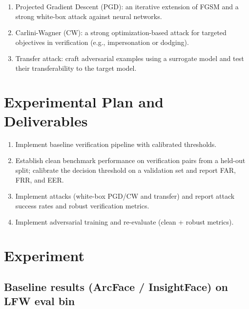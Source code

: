 \documentclass[cameraready]{Interspeech}
\begin{document}
\begin{enumerate}[label=\Roman*)]
    \item Projected Gradient Descent (PGD): an iterative extension of FGSM and a strong white-box attack against neural networks.
    \item Carlini-Wagner (CW): a strong optimization-based attack for targeted objectives in verification (e.g., impersonation or dodging).
    \item Transfer attack: craft adversarial examples using a surrogate model and test their transferability to the target model.
\end{enumerate}

\section{Experimental Plan and Deliverables}
\begin{enumerate}[label=\Roman*)]
    \item Implement baseline verification pipeline with calibrated thresholds. 
    \item Establish clean benchmark performance on verification pairs from a held-out split; calibrate the decision threshold on a validation set and report FAR, FRR, and EER.
    \item Implement attacks (white-box PGD/CW and transfer) and report attack success rates and robust verification metrics.
    \item Implement adversarial training and re-evaluate (clean + robust metrics).
\end{enumerate}

\section{Experiment}

\subsection{Baseline results (ArcFace / InsightFace) on LFW eval bin}

\begin{table}[htb!]
\centering
{}
\vspace{2mm}
\caption{Clean face verification baseline using an ArcFace-style embedding model (InsightFace \texttt{buffalo\_l} recognition backbone \texttt{w600k\_r50}). Verification is performed by cosine similarity with threshold $\tau$. We report the equal error rate (EER) and FAR/FRR at the EER-selected threshold.}
\label{tab:lfw_baseline}
\end{table}
\end{document}
